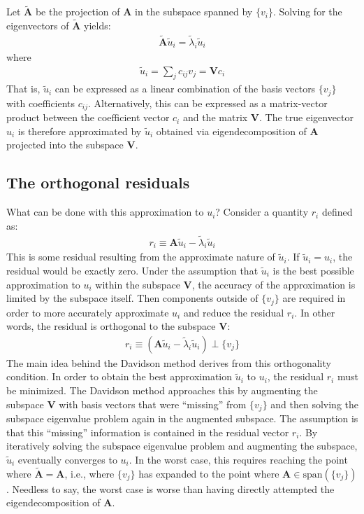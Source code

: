 \documentclass[12pt, fleqn]{article}
\begin{document}
\noindent Let $\tilde{\mathbf{A}}$ be the projection of $\mathbf{A}$ in the subspace spanned by $\{v_i\}$. 
Solving for the eigenvectors of $\tilde{\mathbf{A}}$ yields:
\begin{align}
    \tilde{\mathbf{A}} \tilde{u}_i = \tilde{\lambda}_i \tilde{u}_i
\end{align}
where
\begin{align}
    \tilde{u}_i = \sum_j c_{ij} v_j = \mathbf{V} c_i
\end{align}
That is, $\tilde{u}_i$ can be expressed as a linear combination of the basis vectors $\{v_j\}$ with coefficients $c_{ij}$.
Alternatively, this can be expressed as a matrix-vector product between the coefficient vector $c_i$ and the matrix $\mathbf{V}$.
The true eigenvector $u_i$ is therefore approximated by $\tilde{u}_i$ obtained via eigendecomposition of $\mathbf{A}$ projected into the subspace $\mathbf{V}$. 

\subsection*{The orthogonal residuals}
What can be done with this approximation to $u_i$?
Consider a quantity $r_i$ defined as:
\begin{align}
    r_i \equiv \mathbf{A} \tilde{u}_i - \tilde{\lambda}_i \tilde{u}_i
\end{align}
This is some residual resulting from the approximate nature of $\tilde{u}_i$. 
If $\tilde{u}_i = u_i$, the residual would be exactly zero. 
Under the assumption that $\tilde{u}_i$ is the best possible approximation to $u_i$ within the subspace $\mathbf{V}$, the accuracy of the approximation is limited by the subspace itself.
Then components outside of $\{v_j\}$ are required in order to more accurately approximate $u_i$ and reduce the residual $r_i$. 
In other words, the residual is orthogonal to the subspace $\mathbf{V}$: 
\begin{align}
    r_i \equiv (\mathbf{A} \tilde{u}_i - \tilde{\lambda}_i \tilde{u}_i) \perp \{v_j\}
\end{align}
The main idea behind the Davidson method derives from this orthogonality condition.
In order to obtain the best approximation $\tilde{u}_i$ to $u_i$, the residual $r_i$ must be minimized.
The Davidson method approaches this by augmenting the subspace $\mathbf{V}$ with basis vectors that were ``missing'' from $\{v_j\}$ and then solving the subspace eigenvalue problem again in the augmented subspace.
The assumption is that this ``missing'' information is contained in the residual vector $r_i$. 
By iteratively solving the subspace eigenvalue problem and augmenting the subspace, $\tilde{u}_i$ eventually converges to $u_i$.
In the worst case, this requires reaching the point where $\tilde{\mathbf{A}} = \mathbf{A}$, i.e., where $\{v_j\}$ has expanded to the point where $\mathbf{A} \in \text{span}(\{v_j\})$.
Needless to say, the worst case is worse than having directly attempted the eigendecomposition of $\mathbf{A}$. 
\end{document}
